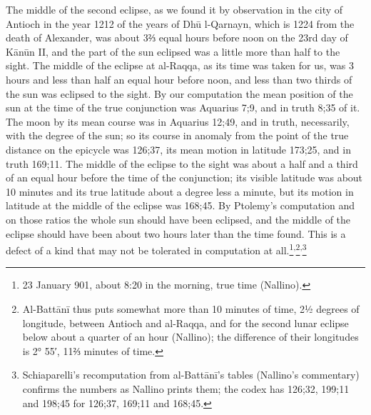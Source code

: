 \documentclass[11pt]{article}
\newcommand{\ArPage}[1]{\marginpar{\footnotesize\color{gray}Ar.\,p.\,#1}}
\begin{document}
\par \ArPage{86}The middle of the second eclipse, as we found it by observation in the city of Antioch in the year 1212 of the years of Dhū l-Qarnayn, which is 1224 from the death of Alexander, was about 3⅔ equal hours before noon on the 23rd day of Kānūn II, and the part of the sun eclipsed was a little more than half to the sight. The middle of the eclipse at al-Raqqa, as its time was taken for us, was 3 hours and less than half an equal hour before noon, and less than two thirds of the sun was eclipsed to the sight. By our computation the mean position of the sun at the time of the true conjunction was Aquarius 7;9, and in truth 8;35 of it. The moon by its mean course was in Aquarius 12;49, and in truth, necessarily, with the degree of the sun; so its course in anomaly from the point of the true distance on the epicycle was 126;37, its mean motion in latitude 173;25, and in truth 169;11. The middle of the eclipse to the sight was about a half and a third of an equal hour before the time of the conjunction; its visible latitude was about 10 minutes and its true latitude about a degree less a minute, but its motion in latitude at the middle of the eclipse was 168;45. By Ptolemy's computation and on those ratios the whole sun should have been eclipsed, and the middle of the eclipse should have been about two hours later than the time found. This is a defect of a kind that may not be tolerated in computation at all.\footnote{23 January 901, about 8:20 in the morning, true time (Nallino).}\textsuperscript{,}\footnote{Al-Battānī thus puts somewhat more than 10 minutes of time, 2½ degrees of longitude, between Antioch and al-Raqqa, and for the second lunar eclipse below about a quarter of an hour (Nallino); the difference of their longitudes is 2° 55′, 11⅔ minutes of time.}\textsuperscript{,}\footnote{Schiaparelli's recomputation from al-Battānī's tables (Nallino's commentary) confirms the numbers as Nallino prints them; the codex has 126;32, 199;11 and 198;45 for 126;37, 169;11 and 168;45.}\par
\end{document}
